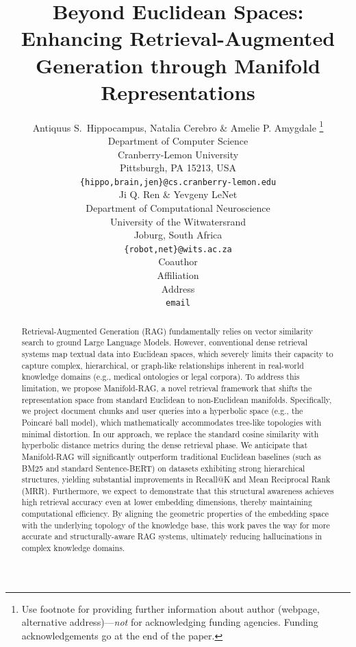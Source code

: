 \documentclass{article} %
\title{Beyond Euclidean Spaces: Enhancing Retrieval-Augmented Generation through Manifold Representations}
\author{Antiquus S.~Hippocampus, Natalia Cerebro \& Amelie P. Amygdale \thanks{ Use footnote for providing further information
about author (webpage, alternative address)---\emph{not} for acknowledging
funding agencies.  Funding acknowledgements go at the end of the paper.} \\
Department of Computer Science\\
Cranberry-Lemon University\\
Pittsburgh, PA 15213, USA \\
\texttt{\{hippo,brain,jen\}@cs.cranberry-lemon.edu} \\
\And
Ji Q. Ren \& Yevgeny LeNet \\
Department of Computational Neuroscience \\
University of the Witwatersrand \\
Joburg, South Africa \\
\texttt{\{robot,net\}@wits.ac.za} \\
\AND
Coauthor \\
Affiliation \\
Address \\
\texttt{email}
}
\begin{document}
\maketitle

\begin{abstract}
Retrieval-Augmented Generation (RAG) fundamentally relies on 
vector similarity search to ground Large Language Models. However, 
conventional dense retrieval systems map textual data into 
Euclidean spaces, which severely limits their capacity to capture 
complex, hierarchical, or graph-like relationships inherent in 
real-world knowledge domains (e.g., medical ontologies or legal corpora). 
To address this limitation, we propose Manifold-RAG, a novel retrieval 
framework that shifts the representation space from standard Euclidean 
to non-Euclidean manifolds. Specifically, we project document chunks and 
user queries into a hyperbolic space (e.g., the Poincaré ball model), 
which mathematically accommodates tree-like topologies with minimal 
distortion. In our approach, we replace the standard cosine 
similarity with hyperbolic distance metrics during the dense retrieval 
phase. We anticipate that Manifold-RAG will significantly outperform 
traditional Euclidean baselines (such as BM25 and standard Sentence-BERT) 
on datasets exhibiting strong hierarchical structures, yielding 
substantial improvements in Recall@K and Mean Reciprocal Rank (MRR). 
Furthermore, we expect to demonstrate that this structural 
awareness achieves high retrieval accuracy even at lower embedding 
dimensions, thereby maintaining computational efficiency. By aligning 
the geometric properties of the embedding space with the underlying 
topology of the knowledge base, this work paves the way for more 
accurate and structurally-aware RAG systems, ultimately reducing 
hallucinations in complex knowledge domains.
\end{abstract}
\end{document}
